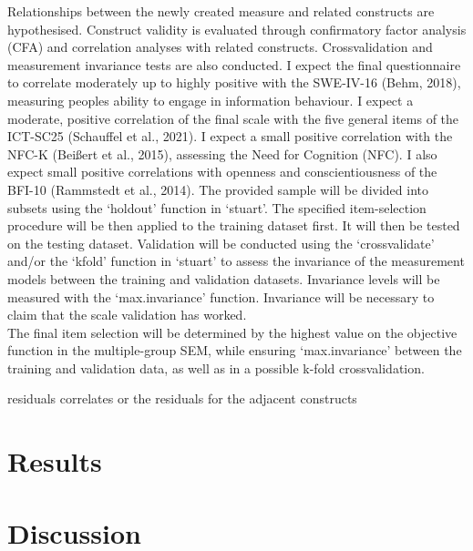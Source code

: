 \documentclass[
  12pt,
  a4paper,
  twoside]{article}
\begin{document}
Relationships between the newly created measure and related constructs
are hypothesised. Construct validity is evaluated through confirmatory
factor analysis (CFA) and correlation analyses with related constructs.
Crossvalidation and measurement invariance tests are also conducted. I
expect the final questionnaire to correlate moderately up to highly
positive with the SWE-IV-16 (Behm, 2018), measuring peoples ability to
engage in information behaviour. I expect a moderate, positive
correlation of the final scale with the five general items of the
ICT-SC25 (Schauffel et al., 2021). I expect a small positive correlation
with the NFC-K (Beißert et al., 2015), assessing the Need for Cognition
(NFC). I also expect small positive correlations with openness and
conscientiousness of the BFI-10 (Rammstedt et al., 2014). The provided
sample will be divided into subsets using the `holdout' function in
`stuart'. The specified item-selection procedure will be then applied to
the training dataset first. It will then be tested on the testing
dataset. Validation will be conducted using the `crossvalidate' and/or
the `kfold' function in `stuart' to assess the invariance of the
measurement models between the training and validation datasets.
Invariance levels will be measured with the `max.invariance' function.
Invariance will be necessary to claim that the scale validation has
worked.\\
The final item selection will be determined by the highest value on the
objective function in the multiple-group SEM, while ensuring
`max.invariance' between the training and validation data, as well as in
a possible k-fold crossvalidation.

residuals correlates or the residuals for the adjacent constructs

\section{Results}\label{results}

\section{Discussion}\label{discussion}
\end{document}
